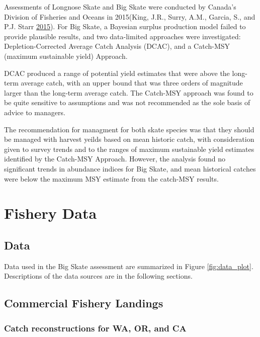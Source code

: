 \documentclass[12pt,]{article}
\begin{document}
Assessments of Longnose Skate and Big Skate were conducted by Canada's
Division of Fisheries and Oceans in 2015(King, J.R., Surry, A.M.,
Garcia, S., and P.J. Starr \protect\hyperlink{ref-King2015}{2015}). For
Big Skate, a Bayesian surplus production model failed to provide
plausible results, and two data-limited approaches were investigated:
Depletion-Corrected Average Catch Analysis (DCAC), and a Catch-MSY
(maximum sustainable yield) Approach.

DCAC produced a range of potential yield estimates that were above the
long-term average catch, with an upper bound that was three orders of
magnitude larger than the long-term average catch. The Catch-MSY
approach was found to be quite sensitive to assumptions and was not
recommended as the sole basis of advice to managers.

The recommendation for managment for both skate species was that they
should be managed with harvest yeilds based on mean historic catch, with
consideration given to survey trends and to the ranges of maximum
sustainable yield estimates identified by the Catch-MSY Approach.
However, the analysis found no significant trends in abundance indices
for Big Skate, and mean historical catches were below the maximum MSY
estimate from the catch-MSY results.

\newpage

\hypertarget{fishery-data}{%
\section{Fishery Data}\label{fishery-data}}

\hypertarget{data}{%
\subsection{Data}\label{data}}

Data used in the Big Skate assessment are summarized in Figure
\ref{fig:data_plot}. Descriptions of the data sources are in the
following sections.

\hypertarget{commercial-fishery-landings}{%
\subsection{Commercial Fishery
Landings}\label{commercial-fishery-landings}}

\hypertarget{catch-reconstructions-for-wa-or-and-ca}{%
\subsubsection{Catch reconstructions for WA, OR, and
CA}\label{catch-reconstructions-for-wa-or-and-ca}}
\end{document}
